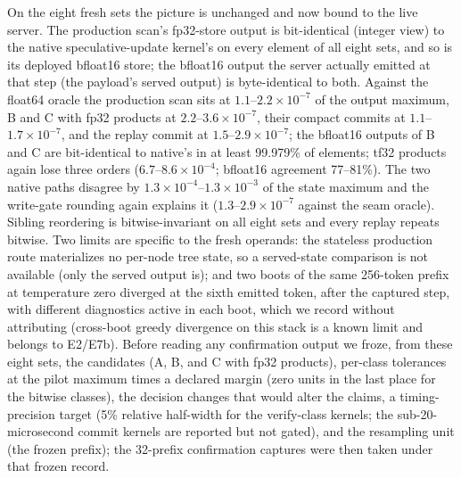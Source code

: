 \documentclass[conference]{IEEEtran}
\begin{document}
On the eight fresh sets the picture is unchanged and now bound to the live server. The production scan's fp32-store output is bit-identical (integer view) to the native speculative-update kernel's on every element of all eight sets, and so is its deployed bfloat16 store; the bfloat16 output the server actually emitted at that step (the payload's served output) is byte-identical to both. Against the float64 oracle the production scan sits at $1.1$--$2.2\times10^{-7}$ of the output maximum, B and C with fp32 products at $2.2$--$3.6\times10^{-7}$, their compact commits at $1.1$--$1.7\times10^{-7}$, and the replay commit at $1.5$--$2.9\times10^{-7}$; the bfloat16 outputs of B and C are bit-identical to native's in at least 99.979\% of elements; tf32 products again lose three orders ($6.7$--$8.6\times10^{-4}$; bfloat16 agreement 77--81\%). The two native paths disagree by $1.3\times10^{-4}$--$1.3\times10^{-3}$ of the state maximum and the write-gate rounding again explains it ($1.3$--$2.9\times10^{-7}$ against the seam oracle). Sibling reordering is bitwise-invariant on all eight sets and every replay repeats bitwise. Two limits are specific to the fresh operands: the stateless production route materializes no per-node tree state, so a served-state comparison is not available (only the served output is); and two boots of the same 256-token prefix at temperature zero diverged at the sixth emitted token, after the captured step, with different diagnostics active in each boot, which we record without attributing (cross-boot greedy divergence on this stack is a known limit and belongs to E2/E7b). Before reading any confirmation output we froze, from these eight sets, the candidates (A, B, and C with fp32 products), per-class tolerances at the pilot maximum times a declared margin (zero units in the last place for the bitwise classes), the decision changes that would alter the claims, a timing-precision target (5\% relative half-width for the verify-class kernels; the sub-20-microsecond commit kernels are reported but not gated), and the resampling unit (the frozen prefix); the 32-prefix confirmation captures were then taken under that frozen record.
\end{document}
